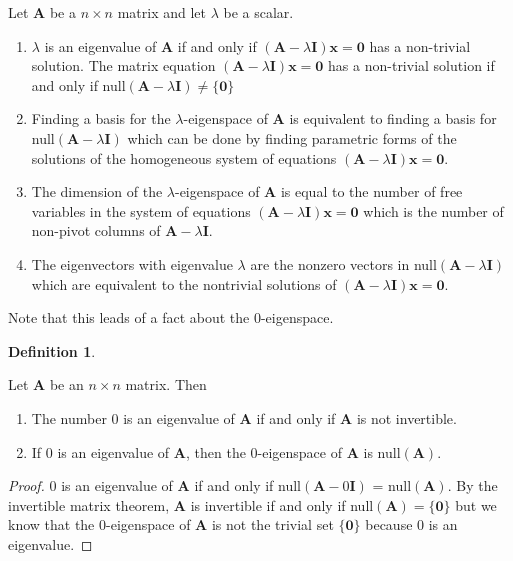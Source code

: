 \documentclass[
]{book}
\theoremstyle{definition}
\newtheorem{definition}{Definition}[chapter]
\theoremstyle{definition}
\theoremstyle{definition}
\theoremstyle{remark}
\begin{document}
Let \(\mathbf{A}\) be a \(n \times n\) matrix and let \(\lambda\) be a scalar.

\begin{enumerate}
\def\labelenumi{\arabic{enumi})}
\item
  \(\lambda\) is an eigenvalue of \(\mathbf{A}\) if and only if \((\mathbf{A} - \lambda \mathbf{I})\mathbf{x} = \mathbf{0}\) has a non-trivial solution. The matrix equation \((\mathbf{A} - \lambda \mathbf{I})\mathbf{x} = \mathbf{0}\) has a non-trivial solution if and only if null\((\mathbf{A} - \lambda \mathbf{I}) \neq \{\mathbf{0} \}\)
\item
  Finding a basis for the \(\lambda\)-eigenspace of \(\mathbf{A}\) is equivalent to finding a basis for null\((\mathbf{A} - \lambda \mathbf{I})\) which can be done by finding parametric forms of the solutions of the homogeneous system of equations \((\mathbf{A} - \lambda \mathbf{I})\mathbf{x} = \mathbf{0}\).
\item
  The dimension of the \(\lambda\)-eigenspace of \(\mathbf{A}\) is equal to the number of free variables in the system of equations \((\mathbf{A} - \lambda \mathbf{I})\mathbf{x} = \mathbf{0}\) which is the number of non-pivot columns of \(\mathbf{A} - \lambda \mathbf{I}\).
\item
  The eigenvectors with eigenvalue \(\lambda\) are the nonzero vectors in null\((\mathbf{A} - \lambda \mathbf{I})\) which are equivalent to the nontrivial solutions of \((\mathbf{A} - \lambda \mathbf{I})\mathbf{x} = \mathbf{0}\).
\end{enumerate}

Note that this leads of a fact about the \(0\)-eigenspace.

\begin{definition}
\protect\hypertarget{def:unlabeled-div-165}{}\label{def:unlabeled-div-165}

Let \(\mathbf{A}\) be an \(n \times n\) matrix. Then

\begin{enumerate}
\def\labelenumi{\arabic{enumi})}
\item
  The number 0 is an eigenvalue of \(\mathbf{A}\) if and only if \(\mathbf{A}\) is not invertible.
\item
  If 0 is an eigenvalue of \(\mathbf{A}\), then the 0-eigenspace of \(\mathbf{A}\) is null\((\mathbf{A})\).
\end{enumerate}

\end{definition}

\begin{proof}

0 is an eigenvalue of \(\mathbf{A}\) if and only if null\((\mathbf{A} - 0 \mathbf{I})\) = null\((\mathbf{A})\). By the invertible matrix theorem, \(\mathbf{A}\) is invertible if and only if null\((\mathbf{A}) = \{\mathbf{0}\}\) but we know that the 0-eigenspace of \(\mathbf{A}\) is not the trivial set \(\{\mathbf{0}\}\) because 0 is an eigenvalue.

\end{proof}
\end{document}
